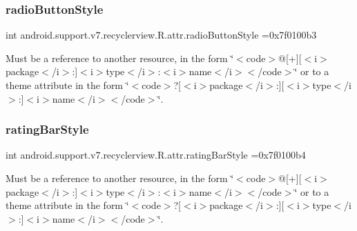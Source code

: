 \subsubsection{\texorpdfstring{radio\+Button\+Style}{radioButtonStyle}}
{\footnotesize\ttfamily int android.\+support.\+v7.\+recyclerview.\+R.\+attr.\+radio\+Button\+Style =0x7f0100b3\hspace{0.3cm}{\ttfamily [static]}}

Must be a reference to another resource, in the form \char`\"{}$<$code$>$@\mbox{[}+\mbox{]}\mbox{[}$<$i$>$package$<$/i$>$\+:\mbox{]}$<$i$>$type$<$/i$>$\+:$<$i$>$name$<$/i$>$$<$/code$>$\char`\"{} or to a theme attribute in the form \char`\"{}$<$code$>$?\mbox{[}$<$i$>$package$<$/i$>$\+:\mbox{]}\mbox{[}$<$i$>$type$<$/i$>$\+:\mbox{]}$<$i$>$name$<$/i$>$$<$/code$>$\char`\"{}. \mbox{\label{classandroid_1_1support_1_1v7_1_1recyclerview_1_1R_1_1attr_aab7ce4b9d7b6999e71323e7b118ed9a1}} 
\subsubsection{\texorpdfstring{rating\+Bar\+Style}{ratingBarStyle}}
{\footnotesize\ttfamily int android.\+support.\+v7.\+recyclerview.\+R.\+attr.\+rating\+Bar\+Style =0x7f0100b4\hspace{0.3cm}{\ttfamily [static]}}

Must be a reference to another resource, in the form \char`\"{}$<$code$>$@\mbox{[}+\mbox{]}\mbox{[}$<$i$>$package$<$/i$>$\+:\mbox{]}$<$i$>$type$<$/i$>$\+:$<$i$>$name$<$/i$>$$<$/code$>$\char`\"{} or to a theme attribute in the form \char`\"{}$<$code$>$?\mbox{[}$<$i$>$package$<$/i$>$\+:\mbox{]}\mbox{[}$<$i$>$type$<$/i$>$\+:\mbox{]}$<$i$>$name$<$/i$>$$<$/code$>$\char`\"{}. \mbox{\label{classandroid_1_1support_1_1v7_1_1recyclerview_1_1R_1_1attr_a7257f910e3a523f11e6ed0a7efdbe3ac}} 
